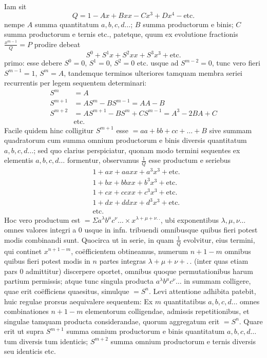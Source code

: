 Iam sit
\[
Q=1-Ax+Bxx-Cx^3+Dx^4-\text{etc.}
\]
nempe $A$ summa quantitatum $a,b,c,d\ldots$; $B$ summa productorum e binis; $C$ summa productorum e ternis etc., patetque, quum ex evolutione fractionis $\frac{x^{m-1}}Q=P$ prodire debeat
\[
S^0+S^1x+S^2xx+S^3x^3+\text{etc.}
\]
primo: esse debere $S^0=0$, $S^1=0$, $S^2=0$ etc. usque ad $S^{m-2}=0$, tunc
vero fieri $S^{m-1}=1$, $S^m=A$, tandemque terminos ulteriores tamquam membra seriei recurrentis per legem sequentem determinari:
\[
\begin{aligned}
S^m&=A\\
S^{m+1}&=AS^m-BS^{m-1}=AA-B\\
S^{m+2}&=AS^{m+1}-BS^m+CS^{m-1}=A^3-2BA+C\\
&\text{etc.}
\end{aligned}
\]
Facile quidem hinc colligitur $S^{m+1}$ esse $=aa+bb+cc+\ldots+B$ sive summam quadratorum cum summa omnium productorum e binis diversis quantitatum $a,b,c,d\ldots$; sed quo clarius perspiciatur, quonam modo termini sequentes ex elementis $a,b,c,d\ldots$ formentur, observamus $\frac1Q$ esse productum e seriebus
\[
\begin{aligned}
&1+ax+aaxx+a^3x^3+\text{etc.}\\
&1+bx+bbxx+b^3x^3+\text{etc.}\\
&1+cx+ccxx+c^3x^3+\text{etc.}\\
&1+dx+ddxx+d^3x^3+\text{etc.}\\
&\text{etc.}
\end{aligned}
\]
Hoc vero productum est $=\Sigma a^\lambda b^\mu c^\nu\ldots\times x^{\lambda+\mu+\nu.\,.}$, ubi exponentibus $\lambda,\mu,\nu\ldots$ omnes valores integri a 0 usque in infn. tribuendi omnibusque quibus fieri potest modis combinandi sunt. Quocirca ut in serie, in quam $\frac1Q$ evolvitur, eius termini, qui continet $x^{n+1-m}$, coëfficientem obtineamus, numerum $n+1-m$ omnibus quibus fieri potest modis in $n$ partes integras $\lambda+\mu+\nu+.\,.$ (inter quas etiam pars 0 admittitur) discerpere oportet, omnibus quoque permutationibus harum partium permissis; atque tunc singula producta $a^\lambda b^\mu c^\nu\ldots$ in summam colligere, quae erit coëfficiens quaesitus, simulque $=S^n$. Levi attentione adhibita patebit, huic regulae prorsus aequivalere sequentem: Ex $m$ quantitatibus $a,b,c,d\ldots$ omnes combinationes $n+1-m$ elementorum colligendae, admissis repetitionibus, et singulae tamquam producta considerandae, quorum aggregatum erit $=S^n$. Quare erit ut supra $S^{m+1}$ summa omnium productorum e binis quantitatum $a,b,c,d\ldots$ tum diversis tum identicis; $S^{m+2}$ summa omnium productorum e ternis diversis seu identicis etc.

